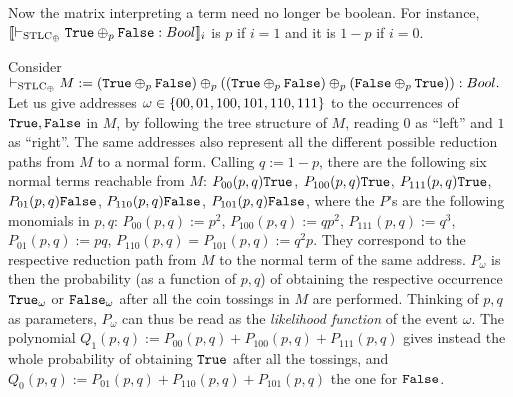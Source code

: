 \begin{remark}
 Now the matrix interpreting a term need no longer be boolean.
 For instance, $\model{\vdash_{\STLC_\oplus} \true\oplus_p\false :\bool}_i$ is $p$ if $i=1$ and it is $1-p$ if $i=0$.
\end{remark}

Consider %
$
 \vdash_{\STLC_\oplus} M:=(\true \oplus_p\false)\oplus_p((\true\oplus_p\false)\oplus_p(\false\oplus_p\true)):\bool.
 $
Let us give addresses $\omega\in\{00,01,100,101,110,111\}$ to the occurrences of $\mathtt{True},\mathtt{False}$ in $M$, by following the tree structure of $M$, reading $0$ as ``left'' and $1$ as ``right''.
The same addresses also represent all the different possible reduction paths from $M$ to a normal form.
Calling $q:=1-p$, there are the following six normal terms reachable from $M$:
$P_{00}(p,q)\mathtt{True}$, 
$P_{100}(p,q)\mathtt{True}$, 
$P_{111}(p,q)\mathtt{True}$, 
$P_{01}(p,q)\mathtt{False}$, 
$P_{110}(p,q)\mathtt{False}$,
$P_{101}(p,q)\mathtt{False}$,
where the $P$'s are the following monomials in $p,q$:
$P_{00}(p,q):=p^2$,
$P_{100}(p,q):=qp^2$,
$P_{111}(p,q):=q^3$,
$P_{01}(p,q):=pq$,
$P_{110}(p,q)=P_{101}(p,q):=q^2p$.
They correspond to the respective reduction path from $M$ to the normal term of the same address.
$P_{\omega}$ is then the probability (as a function of $p,q$) of obtaining the respective occurrence $\mathtt{True}_{\omega}$ or $\mathtt{False}_\omega$ after all the coin tossings in $M$ are performed.
Thinking of $p,q$ as parameters, $P_{\omega}$ can thus be read as the \emph{likelihood function} of the event $\omega$.
The polynomial $Q_{1}(p,q):=P_{00}(p,q)+P_{100}(p,q)+P_{111}(p,q)$ gives instead the whole probability of obtaining $\mathtt{True}$ after all the tossings, and $Q_{0}(p,q):=P_{01}(p,q)+P_{110}(p,q)+P_{101}(p,q)$ the one for $\mathtt{False}$.


